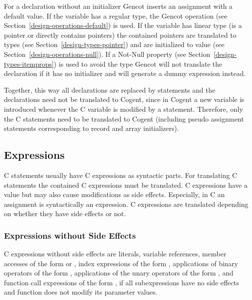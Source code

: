For a declaration without an initializer Gencot inserts an assignment with a default value. If the variable has a regular 
type, the Gencot operation  (see Section~\ref{design-operations-default}) is used. If the variable has 
linear type (is a pointer or directly contains pointers) the contained pointers are translated to  types 
(see Section~\ref{design-types-pointer}) and are initialized to value  (see Section~\ref{design-operations-null}).
If a Not-Null property (see Section~\ref{design-types-itemprops}) is used to avoid the  type Gencot 
will not translate the declaration if it has no initializer and will generate a dummy expression instead.

Together, this way all declarations are replaced by statements and the declarations need not be translated to Cogent, 
since in Cogent a new variable is introduced whenever the C variable is modified by a statement. Therefore, only the C statements 
need to be translated to Cogent (including pseudo assignment statements corresponding to record and array initializers).

\subsection{Expressions}
\label{design-cstats-expr}

C statements usually have C expressions as syntactic parts. For translating C statements the contained C expressions must be 
translated. C expressions have a value but may also cause modifications as side effects. Especially, in C an assignment
is syntactically an expression. C expressions are translated depending on whether they have side effects or not.

\subsubsection{Expressions without Side Effects}

C expressions without side effects are literals, variable references, member accesses of the form  or 
, index
expressions of the form , applications of binary operators of the form , 
applications of the unary operators \code{+,-,!,~} of the form , and function 
call expressions of the form , if all subexpressions
 have no side effects and function  does not modify its parameter values. 

